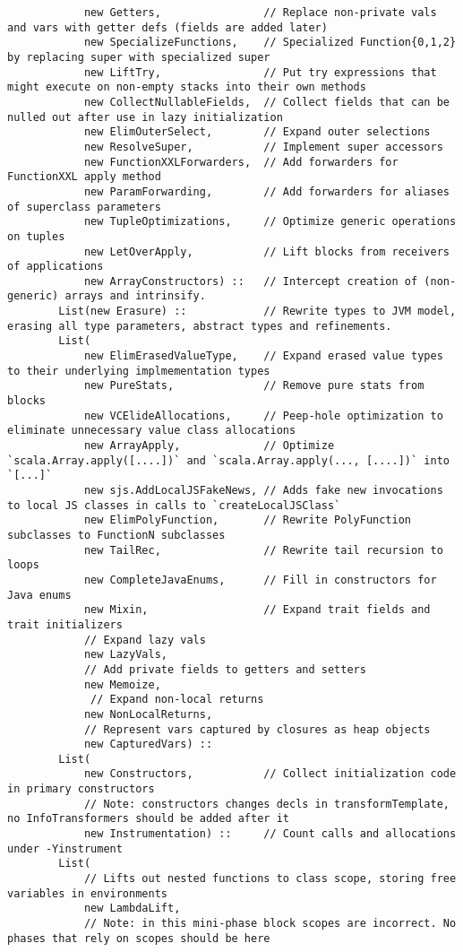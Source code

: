 \documentclass[letterpaper,12pt,titlepage,oneside,final]{book}
\begin{document}
\begin{verbatim}
			new Getters,                // Replace non-private vals and vars with getter defs (fields are added later)
			new SpecializeFunctions,    // Specialized Function{0,1,2} by replacing super with specialized super
			new LiftTry,                // Put try expressions that might execute on non-empty stacks into their own methods
			new CollectNullableFields,  // Collect fields that can be nulled out after use in lazy initialization
			new ElimOuterSelect,        // Expand outer selections
			new ResolveSuper,           // Implement super accessors
			new FunctionXXLForwarders,  // Add forwarders for FunctionXXL apply method
			new ParamForwarding,        // Add forwarders for aliases of superclass parameters
			new TupleOptimizations,     // Optimize generic operations on tuples
			new LetOverApply,           // Lift blocks from receivers of applications
			new ArrayConstructors) ::   // Intercept creation of (non-generic) arrays and intrinsify.
		List(new Erasure) ::            // Rewrite types to JVM model, erasing all type parameters, abstract types and refinements.
		List(
			new ElimErasedValueType,    // Expand erased value types to their underlying implmementation types
			new PureStats,              // Remove pure stats from blocks
			new VCElideAllocations,     // Peep-hole optimization to eliminate unnecessary value class allocations
			new ArrayApply,             // Optimize `scala.Array.apply([....])` and `scala.Array.apply(..., [....])` into `[...]`
			new sjs.AddLocalJSFakeNews, // Adds fake new invocations to local JS classes in calls to `createLocalJSClass`
			new ElimPolyFunction,       // Rewrite PolyFunction subclasses to FunctionN subclasses
			new TailRec,                // Rewrite tail recursion to loops
			new CompleteJavaEnums,      // Fill in constructors for Java enums
			new Mixin,                  // Expand trait fields and trait initializers
			// Expand lazy vals
			new LazyVals,              
			// Add private fields to getters and setters
			new Memoize,                
			 // Expand non-local returns
			new NonLocalReturns,       
			// Represent vars captured by closures as heap objects
			new CapturedVars) ::        
		List(
			new Constructors,           // Collect initialization code in primary constructors
			// Note: constructors changes decls in transformTemplate, no InfoTransformers should be added after it
			new Instrumentation) ::     // Count calls and allocations under -Yinstrument
		List(
			// Lifts out nested functions to class scope, storing free variables in environments
			new LambdaLift,             
			// Note: in this mini-phase block scopes are incorrect. No phases that rely on scopes should be here

\end{verbatim}
\end{document}
